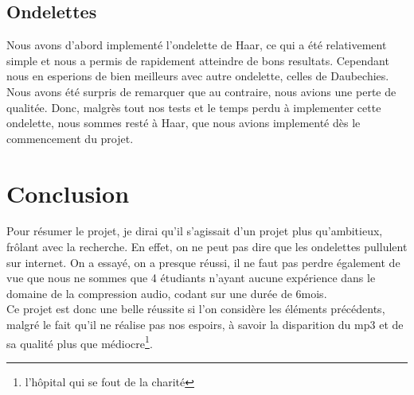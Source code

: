 \documentclass[a4paper,12pt]{report}
\begin{document}
\section{Ondelettes}
Nous avons d'abord implement\'e l'ondelette de Haar, ce qui a \'et\'e
relativement simple et nous a permis de rapidement atteindre de
bons resultats. Cependant nous en esperions de bien meilleurs avec
autre ondelette,  celles de Daubechies. Nous avons \'et\'e surpris de
remarquer que au contraire, nous avions une perte de qualit\'ee. Donc,
malgr\`es tout nos tests et le temps perdu \`a implementer cette
ondelette, nous sommes rest\'e \`a Haar, que nous avions implement\'e d\`es
le commencement du projet.
\chapter{Conclusion}
Pour résumer le projet, je dirai qu'il s'agissait d'un projet plus qu'ambitieux,
frôlant avec la recherche. En effet, on ne peut pas dire que les ondelettes
pullulent sur internet. On a essayé, on a presque réussi, il ne faut pas perdre
également de vue que nous ne sommes que 4 étudiants n'ayant aucune expérience
dans le domaine de la compression audio, codant sur une durée de 6mois.\\
Ce projet est donc une belle réussite si l'on considère les éléments
précédents, malgré le fait qu'il ne réalise pas nos espoirs, à savoir la
disparition du mp3 et de sa qualité plus que médiocre\footnote{l'hôpital qui se
fout de la charité}.
\end{document}

